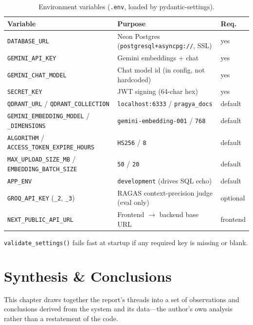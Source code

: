 \documentclass[11pt,a4paper,oneside]{report}
\newcommand{\code}[1]{\texttt{#1}}
\begin{document}
\begin{table}[htbp]
\centering
\caption{Environment variables (\code{.env}, loaded by pydantic-settings).}
\label{tab:env}
\begin{tabularx}{\linewidth}{|L{4.6cm}|X|C{1.5cm}|}
\hline
{}
{\color{white}\textbf{Variable}} & {\color{white}\textbf{Purpose}} & {\color{white}\textbf{Req.}}\\
\hline
\code{DATABASE\_URL} & Neon Postgres (\code{postgresql+asyncpg://}, SSL) & yes\\ \hline
\code{GEMINI\_API\_KEY} & Gemini embeddings + chat & yes\\ \hline
\code{GEMINI\_CHAT\_MODEL} & Chat model id (in config, not hardcoded) & yes\\ \hline
\code{SECRET\_KEY} & JWT signing (64-char hex) & yes\\ \hline
\code{QDRANT\_URL} / \code{QDRANT\_COLLECTION} & \code{localhost:6333} / \code{pragya\_docs} & default\\ \hline
\code{GEMINI\_EMBEDDING\_MODEL} / \code{\_DIMENSIONS} & \code{gemini-embedding-001} / \code{768} & default\\ \hline
\code{ALGORITHM} / \code{ACCESS\_TOKEN\_EXPIRE\_HOURS} & \code{HS256} / \code{8} & default\\ \hline
\code{MAX\_UPLOAD\_SIZE\_MB} / \code{EMBEDDING\_BATCH\_SIZE} & \code{50} / \code{20} & default\\ \hline
\code{APP\_ENV} & \code{development} (drives SQL echo) & default\\ \hline
\code{GROQ\_API\_KEY} (\code{\_2}, \code{\_3}) & RAGAS context-precision judge (eval only) & optional\\ \hline
\code{NEXT\_PUBLIC\_API\_URL} & Frontend $\to$ backend base URL & frontend\\ \hline
\end{tabularx}
\end{table}

\code{validate\_settings()} fails fast at startup if any required key is missing or blank.

\chapter{Synthesis \& Conclusions}
\label{ch:synthesis}

This chapter draws together the report's threads into a set of observations and conclusions derived
from the system and its data---the author's own analysis rather than a restatement of the code.
\end{document}
